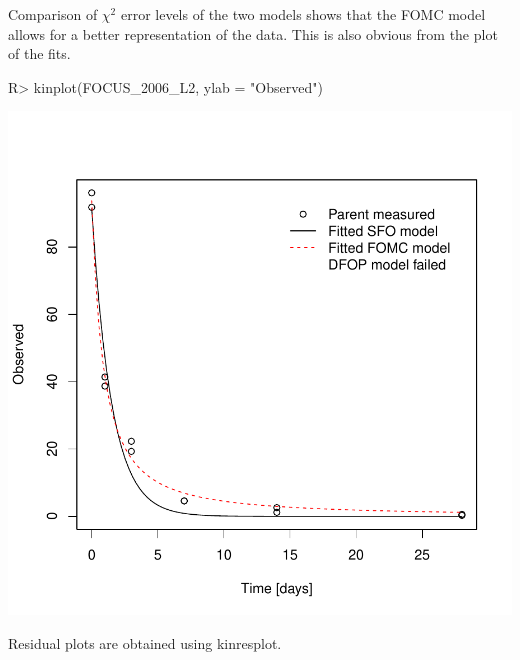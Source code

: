 \documentclass[12pt,a4paper]{article}
\begin{document}
Comparison of $\chi^2$ error levels of the two models shows that the FOMC model allows
for a better representation of the data.  This is also obvious from the plot
of the fits.

\begin{Schunk}
\begin{Sinput}
R> kinplot(FOCUS_2006_L2, ylab = "Observed")
\end{Sinput}
\end{Schunk}
\includegraphics{examples-L2_plot}

Residual plots are obtained using kinresplot.
\end{document}
